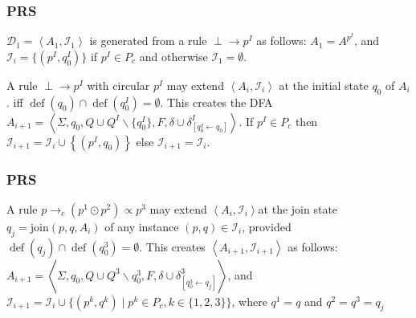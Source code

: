 \documentclass[aspectratio=169%
,serif,mathserif]{beamer}
\begin{document}
\begin{frame}
	\frametitle{PRS}
	\begin{definition}
		$\mathcal{D}_{1}=\left\langle A_{1}, \mathcal{I}_{1}\right\rangle$ is generated from a rule
		$\perp \rightarrow p^{I}$ as follows: $A_{1}=A^{p^{I}}$, and 
		$\mathcal{I}_{i}=\{\left(p^{I}, q_{0}^{I}\right)\}$ if 
		$p^{I} \in P_{c}$ and otherwise $\mathcal{I}_{1}=\emptyset$.
	\end{definition}

	\begin{definition}
		A rule $\perp \rightarrow p^{I}$ with circular $p^{I}$ may extend $\left\langle A_{i}, \mathcal{I}_{i}\right\rangle$ at the initial state $q_{0}$ of $A_{i}$.
		iff $\operatorname{def}\left(q_{0}\right)\cap\operatorname{def}\left(q_{0}^{I}\right)=\emptyset$. 
		This creates the DFA $A_{i+1}=\left\langle\Sigma, q_{0}, Q \cup Q^{I} \backslash\{q_{0}^{I}\}, F, \delta \cup \delta_{[q_{0}^{I} \leftarrow q_{0}]}^{I}\right\rangle$.
		If $p^{I}\in P_{c}$ then $\mathcal{I}_{i+1}=\mathcal{I}_{i} \cup\left\{(p^{I}, q_{0})\right\}$
		else $\mathcal{I}_{i+1}=\mathcal{I}_{i}$.
	\end{definition}

\end{frame}

\begin{frame}
	\frametitle{PRS}
	\begin{definition}
		A rule $p \rightarrow_{c}\left(p^{1} \odot p^{2}\right) \propto p^{3}$ may extend
		$\left\langle A_{i}, \mathcal{I}_{i}\right\rangle $at the join state $q_{j}=\mathrm{join}\left(p, q, A_{i}\right)$
		of any instance $(p, q) \in \mathcal{I}_{i}$, provided 
		$\operatorname{def}\left(q_{j}\right) \cap \operatorname{def}\left(q_{0}^{3}\right)=\emptyset$.
		This creates $\left\langle A_{i+1}, \mathcal{I}_{i+1}\right\rangle$ 
		as follows: $A_{i+1}=\left\langle\Sigma, q_{0}, Q \cup Q^{3} \backslash q_{0}^{3}, F, \delta \cup \delta_{\left[q_{0}^{3} \leftarrow q_{j}\right]}^{3}\right\rangle$, 
		and $\mathcal{I}_{i+1}=\mathcal{I}_{i} \cup \{(p^{k}, q^{k}) \mid p^{k} \in P_{c}, k \in\{1,2,3\}\}$, 
		where $q^{1}=q$ and $q^{2}=q^{3}=q_{j}$
	\end{definition}
\end{frame}
\end{document}
